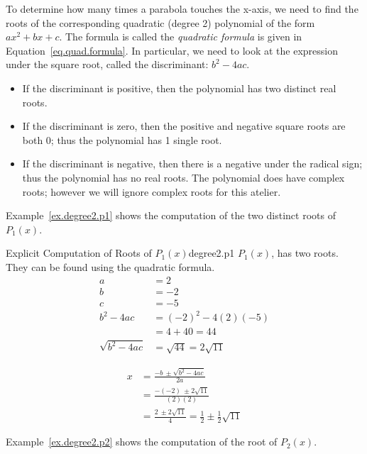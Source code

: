 To determine how many times a parabola touches the x-axis, we need to
find the roots of the corresponding quadratic (degree 2) polynomial of
the form $a x^2 + b x + c$.  The formula is called the \emph{quadratic
formula} is given in Equation~\eqref{eq.quad.formula}.  In particular,
we need to look at the expression under the square root, called the
discriminant: $b^2 - 4a c$.
\begin{itemize}
\item If the discriminant is positive, then the polynomial has two
  distinct real roots.
\item If the discriminant is zero, then the positive and negative
  square roots are both 0; thus the polynomial has 1 single root.
\item If the discriminant is negative, then there is a negative under
  the radical sign; thus the polynomial has no real roots.  The
  polynomial does have complex roots; however we will ignore complex
  roots for this atelier.
\end{itemize}

Example~\ref{ex.degree2.p1} shows the computation of the two distinct roots of $P_1(x)$.

\begin{example}{Explicit Computation of Roots of $P_1(x)$}{degree2.p1}
  $P_1(x)$, has two roots.  They can be found using the quadratic formula.
  \begin{align*}
    a&=2\\
    b&=-2\\
    c&=-5\\
    b^2 - 4a c &= (-2)^2 - 4 (2) (-5)\\
    &= 4 + 40 = 44\\
    \sqrt{b^2 - 4a c} &= \sqrt{44} = 2\sqrt{11}
  \end{align*}

\begin{align}
  x &= \frac{-b~ \pm \sqrt{b^2 - 4a c}}{2a}\label{eq.quad.formula}\\
  &= \frac{-(-2)~ \pm 2\sqrt{11}}{(2)(2)}\nonumber\\
  &= \frac{2 ~\pm 2\sqrt{11}}{4}
  = \frac{1}{2} \pm \frac{1}{2}\sqrt{11}\nonumber
\end{align}
  
\end{example}

Example~\ref{ex.degree2.p2} shows the computation of the root of $P_2(x)$.

